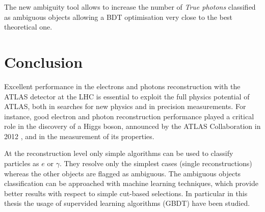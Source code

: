 \documentclass[a4paper, oneside, 11pt, openright]{book}
\begin{document}
			The new ambiguity tool allows to increase the number of \textit{True photons} classified as ambiguous objects allowing a BDT optimisation very close to the best theoretical one.
		
	\chapter{Conclusion}
		Excellent performance in the electrons and photons reconstruction with the ATLAS detector at the LHC is essential to exploit the full physics potential of ATLAS, both in searches for new physics and in precision measurements. For instance, good electron and photon reconstruction performance played a critical role in the discovery of a Higgs boson, announced by the ATLAS Collaboration in 2012 \cite{Higgs}, and in the measurement of its properties.
		
		At the reconstruction level only simple algorithms can be used to classify particles as $e$ or $\gamma$. They resolve only the simplest cases (single reconstructions) whereas the other objects are flagged as ambiguous. The ambiguous objects classification can be approached with machine learning techniques, which provide better results with respect to simple cut-based selections. In particular in this thesis the usage of supervided learning algorithms (GBDT) have been studied.
		
\end{document}
